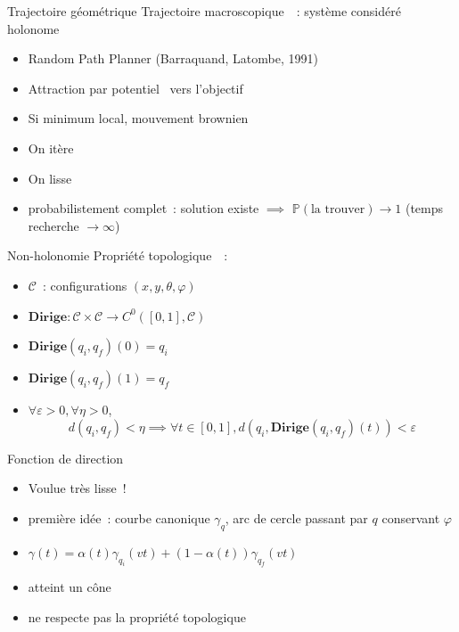 \documentclass[11pt]{beamer}
\newcommand{\steer}{\textbf{Dirige}}
\newcommand{\confspace}{\mathcal{C}}
\begin{document}
\begin{frame}{Trajectoire géométrique}
	Trajectoire \og{}macroscopique~\fg~: système considéré holonome
	\begin{itemize}
		\item Random Path Planner (Barraquand, Latombe, 1991)
		\item Attraction par \og{}potentiel~\fg{} vers l'objectif
		\item Si minimum local, mouvement brownien
		\item On itère
		\item On lisse
			\vspace{1em}
		\item probabilistement complet~: solution existe $\implies$
			$\mathbb{P}(\text{la trouver}) \rightarrow 1$ (temps recherche
			$\rightarrow \infty$)
	\end{itemize}
\end{frame}

\begin{frame}{Non-holonomie}
	\og{}Propriété topologique~\fg~:
	\begin{itemize}
		\item $\confspace$~: configurations $(x, y, \theta, \varphi)$
		\item $\steer: \confspace \times \confspace \to C^0(\left[0, 1\right],
			\confspace)$
		\item $\steer(q_i, q_f)(0) = q_i$
		\item $\steer(q_i, q_f)(1) = q_f$
		\item $\forall \varepsilon > 0, \forall \eta > 0$,
			\[d(q_i, q_f) < \eta \implies \forall t \in [0, 1],
			d(q_i, \steer(q_i, q_f)(t)) < \varepsilon \]
	\end{itemize}
\end{frame}

\begin{frame}{Fonction de direction}
	\begin{itemize}
		\item Voulue très lisse~!
		\item première idée~: courbe canonique $\gamma_q$, arc de cercle
			passant par $q$ conservant $\varphi$
		\item $\gamma(t) = \alpha(t) \gamma_{q_i}(vt) + (1-\alpha(t))
			\gamma_{q_f}(vt)$
		\item atteint un \og{}cône~\fg{}
		\item ne respecte pas la propriété topologique
	\end{itemize}
\end{frame}
\end{document}
